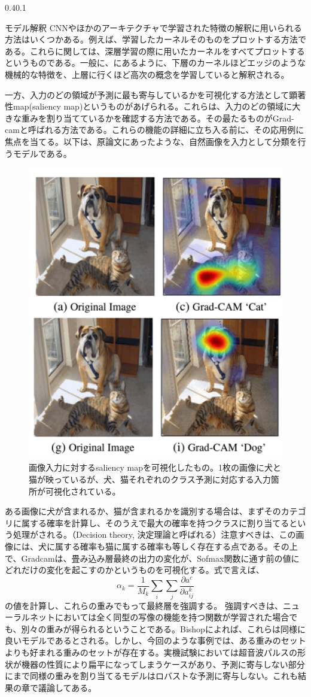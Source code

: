 \documentclass[uplatex]{suribt}
\makeatletter
\renewcommand{\subsection}{%
    \@startsection{subsection}{1}{\z@}%
    {0.4\Cvs}{0.1\Cvs}%
    {\normalfont\normalsize\headfont\raggedright}}
\makeatother
\begin{document}
\subsection{モデル解釈}
CNNやほかのアーキテクチャで学習された特徴の解釈に用いられる方法はいくつかある。例えば、学習したカーネルそのものをプロットする方法である。これらに関しては、深層学習の際に用いたカーネルをすべてプロットするというものである。一般に、\cite{Bishop:DeepLearning24}にあるように、下層のカーネルほどエッジのような機械的な特徴を、上層に行くほど高次の概念を学習していると解釈される。\par
一方、入力のどの領域が予測に最も寄与しているかを可視化する方法として顕著性map(saliency map)というものがあげられる。これらは、入力のどの領域に大きな重みを割り当てているかを確認する方法である。その最たるものがGrad-cam\cite{Selvaraju_2019}と呼ばれる方法である。これらの機能の詳細に立ち入る前に、その応用例に焦点を当てる。以下は、原論文にあったような、自然画像を入力として分類を行うモデルである。
\begin{figure}[htbp]
    \centering
    \includegraphics[width=0.5\linewidth]{pictures/explanation/grad_cam_explained.png}
    \caption{画像入力に対するsaliency mapを可視化したもの。1枚の画像に犬と猫が映っているが、犬、猫それぞれのクラス予測に対応する入力箇所が可視化されている。}
    \label{fig:gradcam}
\end{figure}
ある画像に犬が含まれるか、猫が含まれるかを識別する場合は、まずそのカテゴリに属する確率を計算し、そのうえで最大の確率を持つクラスに割り当てるという処理がされる。（Decision theory, 決定理論と呼ばれる）注意すべきは、この画像には、犬に属する確率も猫に属する確率も等しく存在する点である。その上で、Gradcamは、畳み込み層最終の出力の変化が、Sofmax関数に通す前の値にどれだけの変化を起こすのかというものを可視化する。式で言えば、
\begin{equation}
    \alpha_k=\frac{1}{M_k}\sum_i\sum_j{\frac{\partial a^c}{\partial a_{ij}^k}}
\end{equation}
の値を計算し、これらの重みでもって最終層を強調する。
強調すべきは、ニューラルネットにおいては全く同型の写像の機能を持つ関数が学習された場合でも、別々の重みが得られるということである。Bishop\cite{PRML}によれば、これらは同様に良いモデルであるとされる。しかし、今回のような事例では、ある重みのセットよりも好まれる重みのセットが存在する。実機試験においては超音波パルスの形状が機器の性質により扁平になってしまうケースがあり、予測に寄与しない部分にまで同様の重みを割り当てるモデルはロバストな予測に寄与しない。これも結果の章で議論してある。
\end{document}
